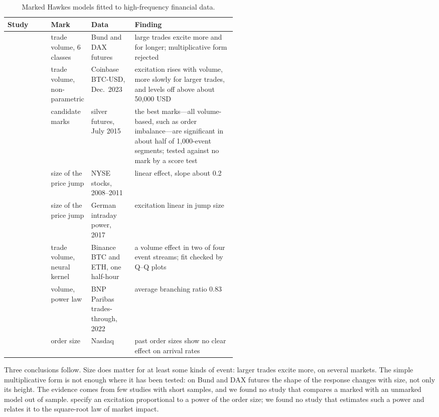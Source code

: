 \begin{table}[!htbp]
\centering\footnotesize
\caption{Marked Hawkes models fitted to high-frequency financial data.}
\label{tab:marks-evidence}
\setlength{\tabcolsep}{3pt}
\begin{tabularx}{\linewidth}{>{\raggedright\arraybackslash}p{0.19\linewidth}>{\raggedright\arraybackslash}p{0.15\linewidth}>{\raggedright\arraybackslash}p{0.19\linewidth}>{\raggedright\arraybackslash}X}
\toprule
Study & Mark & Data & Finding \\
\midrule
\citet{rambaldi2017marked} & trade volume, 6 classes & Bund and DAX futures & large trades excite more and for longer; multiplicative form rejected \\
\citet{fabre2025neuralhawkes} & trade volume, non-parametric & Coinbase BTC-USD, Dec.\ 2023 & excitation rises with volume, more slowly for larger trades, and levels off above about 50{,}000 USD \\
\citet{richards2025scoretest} & 21 candidate marks & silver futures, July 2015 & the best marks---all volume-based, such as order imbalance---are significant in about half of 1{,}000-event segments; tested against no mark by a score test \\
\citet{leeseo2017marked} & size of the price jump & NYSE stocks, 2008--2011 & linear effect, slope about 0.2 \\
\citet{deschatre2022electricity} & size of the price jump & German intraday power, 2017 & excitation linear in jump size \\
\citet{josephjain2024marked} & trade volume, neural kernel & Binance BTC and ETH, one half-hour & a volume effect in two of four event streams; fit checked by Q--Q plots \\
\citet{chevalier2023disorder} & volume, power law & BNP Paribas trades-through, 2022 & average branching ratio 0.83 \\
\citet{jain2024chp} & order size & Nasdaq & past order sizes show no clear effect on arrival rates \\
\bottomrule
\end{tabularx}
\end{table}

Three conclusions follow. Size does matter for at least some kinds of event: larger trades excite more, on
several markets. The simple multiplicative form is not enough where it has been tested: on Bund and DAX futures
the shape of the response changes with size, not only its height. The evidence comes from few studies with short
samples, and we found no study that compares a marked with an unmarked model out of sample. \citet{fauthtudor2012}
specify an excitation proportional to a power of the order size; we found no
study that estimates such a power and relates it to the square-root law of market impact.


